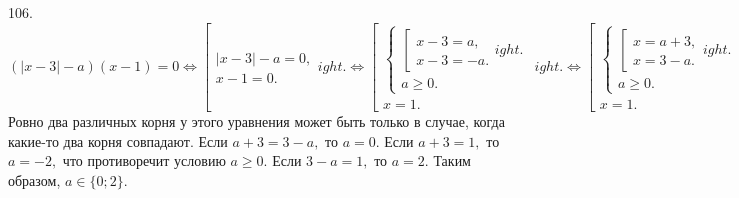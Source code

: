 106. $(|x-3|-a)(x-1)=0\Leftrightarrow \left[\begin{array}{l}|x-3|-a=0,\\ x-1=0.\end{array}
ight.\Leftrightarrow
\left[\begin{array}{l}
\begin{cases}
\left[\begin{array}{l}
x-3=a,\\
x-3=-a.
\end{array}
ight.\\
a\geqslant0.
\end{cases}\\
x=1.
\end{array}
ight.\Leftrightarrow
\left[\begin{array}{l}
\begin{cases}
\left[\begin{array}{l}
x=a+3,\\
x=3-a.
\end{array}
ight.\\
a\geqslant0.
\end{cases}\\
x=1.
\end{array}
ight.$
Ровно два различных корня у этого уравнения может быть только в случае, когда какие-то два корня совпадают. Если $a+3=3-a,$ то $a=0.$ Если $a+3=1,$ то $a=-2,$ что противоречит условию $a\geqslant0.$ Если $3-a=1,$ то $a=2.$ Таким образом, $a\in\{0;2\}.$\\
